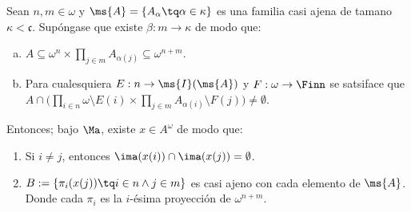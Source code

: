 	\begin{lema}
		Sean $n,m \in \omega$ y $\ms{A}=\{A_\alpha \tq \alpha \in \kappa\}$ es una familia casi ajena de tamano $\kappa<\mathfrak{c}$. Supóngase que existe $\beta : m \to \kappa$  de modo que:
		\begin{enumerate}[a)]
			\item $A \subseteq \omega^n \times \prod_{j \in m} {A_{\alpha(j)}} \subseteq \omega^{n+m}$.
			\item Para cualesquiera $E: n \to \ms{I}(\ms{A})$ y $F: \omega \to \Finn$ se satsiface que $A \cap \Big( \prod_{i \in n} \omega \setminus E(i) \times \prod_{j \in m} A_{\alpha(i)} \setminus F(j) \Big)\neq \emptyset$.
		\end{enumerate}
		Entonces; bajo $\Ma$, existe $x \in A^\omega$ de modo que:
		\begin{enumerate}
			\item Si $i \neq j$, entonces $\ima(x(i)) \cap \ima(x(j)) = \emptyset$.
			\item $B:=\{ \pi_i (x(j)) \tq i \in n \land j \in m \}$ es casi ajeno con cada elemento de $\ms{A}$. Donde cada $\pi_i$ es la $i$-ésima proyección de $\omega^{n+m}$.
		\end{enumerate}
	\end{lema}